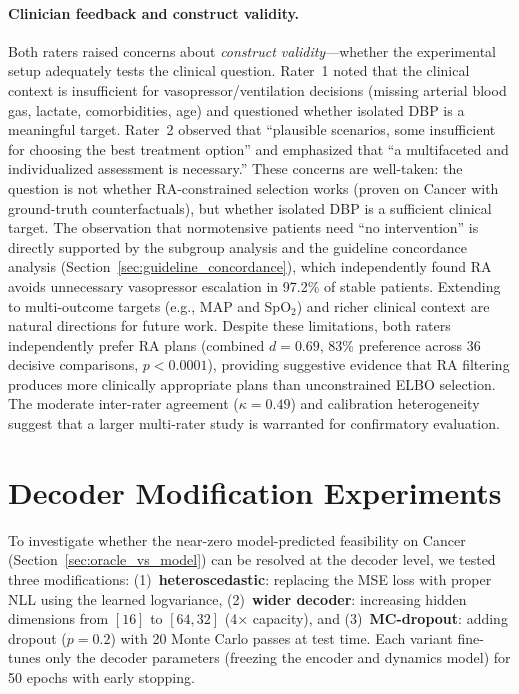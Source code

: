 \documentclass{article}
\begin{document}
\paragraph{Clinician feedback and construct validity.} Both raters raised concerns about \emph{construct validity}---whether the experimental setup adequately tests the clinical question. Rater~1 noted that the clinical context is insufficient for vasopressor/ventilation decisions (missing arterial blood gas, lactate, comorbidities, age) and questioned whether isolated DBP is a meaningful target. Rater~2 observed that ``plausible scenarios, some insufficient for choosing the best treatment option'' and emphasized that ``a multifaceted and individualized assessment is necessary.'' These concerns are well-taken: the question is not whether RA-constrained selection works (proven on Cancer with ground-truth counterfactuals), but whether isolated DBP is a sufficient clinical target. The observation that normotensive patients need ``no intervention'' is directly supported by the subgroup analysis and the guideline concordance analysis (Section~\ref{sec:guideline_concordance}), which independently found RA avoids unnecessary vasopressor escalation in 97.2\% of stable patients. Extending to multi-outcome targets (e.g., MAP and SpO$_2$) and richer clinical context are natural directions for future work. Despite these limitations, both raters independently prefer RA plans (combined $d = 0.69$, 83\% preference across 36 decisive comparisons, $p < 0.0001$), providing suggestive evidence that RA filtering produces more clinically appropriate plans than unconstrained ELBO selection. The moderate inter-rater agreement ($\kappa = 0.49$) and calibration heterogeneity suggest that a larger multi-rater study is warranted for confirmatory evaluation.


\section{Decoder Modification Experiments}
\label{app:decoder_mods}

To investigate whether the near-zero model-predicted feasibility on Cancer (Section~\ref{sec:oracle_vs_model}) can be resolved at the decoder level, we tested three modifications: (1)~\textbf{heteroscedastic}: replacing the MSE loss with proper NLL using the learned logvariance, (2)~\textbf{wider decoder}: increasing hidden dimensions from $[16]$ to $[64, 32]$ (4$\times$ capacity), and (3)~\textbf{MC-dropout}: adding dropout ($p = 0.2$) with 20 Monte Carlo passes at test time. Each variant fine-tunes only the decoder parameters (freezing the encoder and dynamics model) for 50 epochs with early stopping.
\end{document}
